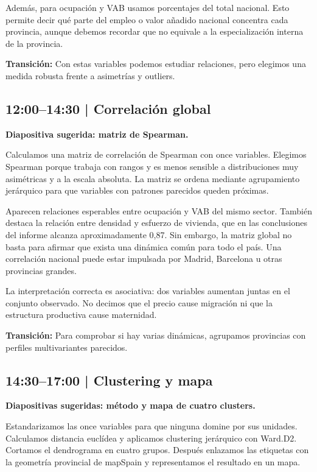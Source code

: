 \documentclass[11pt,a4paper]{article}
\begin{document}
Además, para ocupación y VAB usamos porcentajes del total nacional. Esto permite decir qué parte del empleo o valor añadido nacional concentra cada provincia, aunque debemos recordar que no equivale a la especialización interna de la provincia.

\textbf{Transición:} Con estas variables podemos estudiar relaciones, pero elegimos una medida robusta frente a asimetrías y outliers.

\subsection{12:00--14:30 | Correlación global}
\textbf{Diapositiva sugerida: matriz de Spearman.}

Calculamos una matriz de correlación de Spearman con once variables. Elegimos Spearman porque trabaja con rangos y es menos sensible a distribuciones muy asimétricas y a la escala absoluta. La matriz se ordena mediante agrupamiento jerárquico para que variables con patrones parecidos queden próximas.

Aparecen relaciones esperables entre ocupación y VAB del mismo sector. También destaca la relación entre densidad y esfuerzo de vivienda, que en las conclusiones del informe alcanza aproximadamente 0,87. Sin embargo, la matriz global no basta para afirmar que exista una dinámica común para todo el país. Una correlación nacional puede estar impulsada por Madrid, Barcelona u otras provincias grandes.

La interpretación correcta es asociativa: dos variables aumentan juntas en el conjunto observado. No decimos que el precio cause migración ni que la estructura productiva cause maternidad.

\textbf{Transición:} Para comprobar si hay varias dinámicas, agrupamos provincias con perfiles multivariantes parecidos.

\subsection{14:30--17:00 | Clustering y mapa}
\textbf{Diapositivas sugeridas: método y mapa de cuatro clusters.}

Estandarizamos las once variables para que ninguna domine por sus unidades. Calculamos distancia euclídea y aplicamos clustering jerárquico con Ward.D2. Cortamos el dendrograma en cuatro grupos. Después enlazamos las etiquetas con la geometría provincial de mapSpain y representamos el resultado en un mapa.
\end{document}
